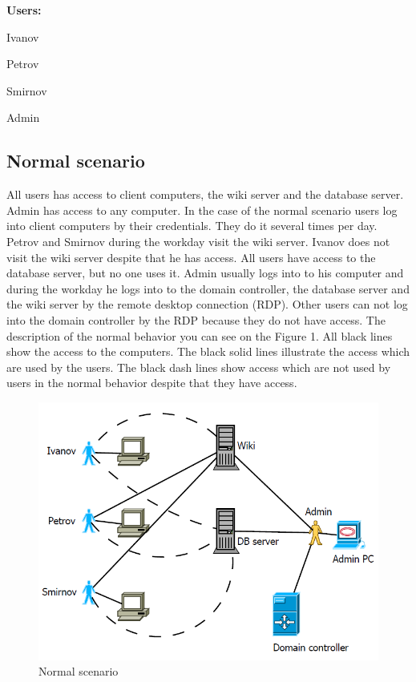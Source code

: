 \begin{compactitem}
\item [\textbf{Users:}]
\item Ivanov
\item Petrov
\item Smirnov
\item Admin
\end{compactitem}
     
\subsection{Normal scenario}
All users has access to client computers, the wiki server and the database server. Admin has access to any computer. In the case of the normal scenario users log into client computers by their credentials. They do it several times per day. Petrov and Smirnov during the workday visit the wiki server. Ivanov does not visit the wiki server despite that he has access. All users have access to the database server, but no one uses it. Admin usually logs into to his computer and during the workday he logs into to the domain controller, the database server and the wiki server by the remote desktop connection (RDP). Other users can not log into the domain controller by the RDP because they do not have access. The description of the normal behavior you can see on the Figure 1. All black lines show the access to the computers. The black solid lines illustrate the access which are used by the users. The black dash lines show access which are not used by users in the normal behavior despite that they have access. 
\begin{figure}[ht!]
\centering
\includegraphics[width=\textwidth]{scenario_normal.png}
\caption{Normal scenario}
\label{overflow}
\end{figure}

